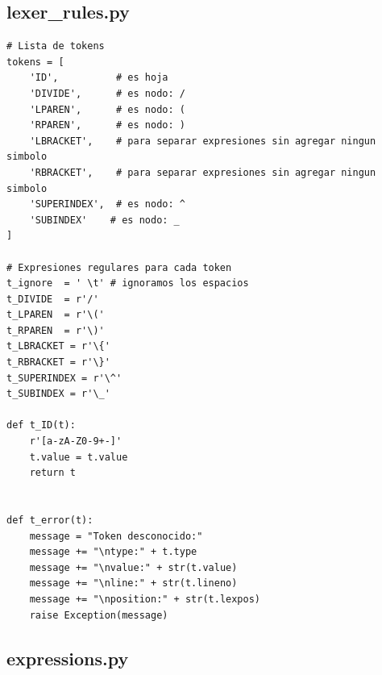\documentclass[a4paper, 10pt, twoside]{article}
\begin{document}
\subsection{lexer_rules.py}
% 
\begin{lstlisting}
# Lista de tokens
tokens = [
    'ID',          # es hoja
    'DIVIDE',      # es nodo: /
    'LPAREN',      # es nodo: (
    'RPAREN',      # es nodo: )
    'LBRACKET',    # para separar expresiones sin agregar ningun simbolo
    'RBRACKET',    # para separar expresiones sin agregar ningun simbolo
    'SUPERINDEX',  # es nodo: ^
    'SUBINDEX'    # es nodo: _
]

# Expresiones regulares para cada token
t_ignore  = ' \t' # ignoramos los espacios
t_DIVIDE  = r'/'
t_LPAREN  = r'\('
t_RPAREN  = r'\)'
t_LBRACKET = r'\{'
t_RBRACKET = r'\}'
t_SUPERINDEX = r'\^'
t_SUBINDEX = r'\_'

def t_ID(t):
    r'[a-zA-Z0-9+-]'
    t.value = t.value
    return t


def t_error(t):
    message = "Token desconocido:"
    message += "\ntype:" + t.type
    message += "\nvalue:" + str(t.value)
    message += "\nline:" + str(t.lineno)
    message += "\nposition:" + str(t.lexpos)
    raise Exception(message)

\end{lstlisting}


\subsection{expressions.py}

\end{document}
